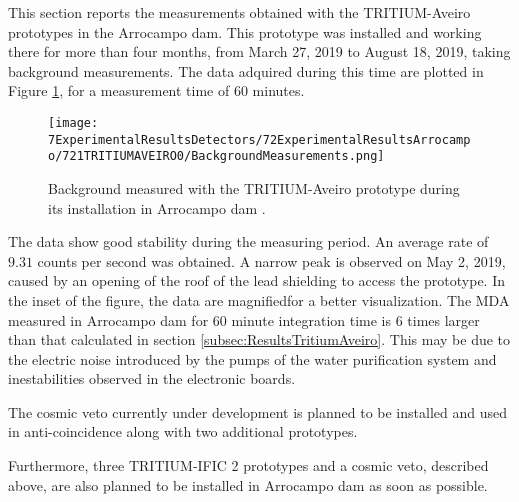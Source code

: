 This section reports the measurements obtained with the TRITIUM-Aveiro prototypes in the Arrocampo dam. This prototype was installed and working there for more than four months, from March 27, 2019 to August 18, 2019, taking background measurements. The data adquired during this time are plotted in Figure \ref{fig:BackgroundArrocampoAveiro}, for a measurement time of 60 minutes.

\begin{figure}[h]
\centering
\texttt{[image: 7ExperimentalResultsDetectors/72ExperimentalResultsArrocampo/721TRITIUMAVEIRO0/BackgroundMeasurements.png]}
\caption{Background measured with the TRITIUM-Aveiro prototype during its installation in Arrocampo dam \cite{ExperimentalPaperCarlos}.\label{fig:BackgroundArrocampoAveiro}}
\end{figure}
The data show good stability during the measuring period. An average rate of $9.31$ counts per second was obtained. A narrow peak is observed on May 2, 2019, caused by an opening of the roof of the lead shielding to access the prototype. In the inset of the figure, the data are magnifiedfor a better visualization. The MDA measured in Arrocampo dam for 60 minute integration time is 6 times larger than that calculated in section \ref{subsec:ResultsTritiumAveiro}. This may be due to the electric noise introduced by the pumps of the water purification system and inestabilities observed in the electronic boards.

The cosmic veto currently under development is planned to be installed and used in anti-coincidence along with two additional prototypes.

Furthermore, three TRITIUM-IFIC 2 prototypes and a cosmic veto, described above, are also planned to be installed in Arrocampo dam as soon as possible.
